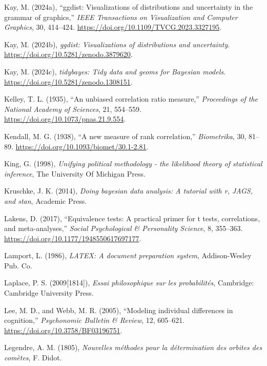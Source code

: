 \documentclass[
  10pt,
  a4paper,
  twoside]{article}
\newlength{\cslhangindent}
\newenvironment{CSLReferences}[2] %
 {\begin{list}{}{%
  \setlength{\itemindent}{0pt}
  \setlength{\leftmargin}{0pt}
  \setlength{\parsep}{0pt}
  \ifodd #1
   \setlength{\leftmargin}{\cslhangindent}
   \setlength{\itemindent}{-1\cslhangindent}
  \fi
  \setlength{\itemsep}{#2\baselineskip}}}
 {\end{list}}
\begin{document}
\begin{CSLReferences}{1}{0}
Kay, M. (2024a), {``{ggdist}: Visualizations of distributions and uncertainty in the grammar of graphics,''} \emph{IEEE Transactions on Visualization and Computer Graphics}, 30, 414--424. \url{https://doi.org/10.1109/TVCG.2023.3327195}.

Kay, M. (2024b), \emph{{ggdist}: Visualizations of distributions and uncertainty}. \url{https://doi.org/10.5281/zenodo.3879620}.

Kay, M. (2024c), \emph{{tidybayes}: Tidy data and geoms for {Bayesian} models}. \url{https://doi.org/10.5281/zenodo.1308151}.

Kelley, T. L. (1935), {``An unbiased correlation ratio measure,''} \emph{Proceedings of the National Academy of Sciences}, 21, 554--559. \url{https://doi.org/10.1073/pnas.21.9.554}.

Kendall, M. G. (1938), {``A new measure of rank correlation,''} \emph{Biometrika}, 30, 81--89. \url{https://doi.org/10.1093/biomet/30.1-2.81}.

King, G. (1998), \emph{Unifying political methodology - the likelihood theory of statistical inference}, The University Of Michigan Press.

Kruschke, J. K. (2014), \emph{Doing bayesian data analysis: A tutorial with r, JAGS, and stan}, Academic Press.

Lakens, D. (2017), {``Equivalence tests: A practical primer for t tests, correlations, and meta-analyses,''} \emph{Social Psychological \& Personality Science}, 8, 355--363. \url{https://doi.org/10.1177/1948550617697177}.

Lamport, L. (1986), \emph{LATEX: A document preparation system}, Addison-Wesley Pub. Co.

Laplace, P. S. (2009{[}1814{]}), \emph{Essai philosophique sur les probabilités}, Cambridge: Cambridge University Press.

Lee, M. D., and Webb, M. R. (2005), {``Modeling individual differences in cognition,''} \emph{Psychonomic Bulletin \& Review}, 12, 605--621. \url{https://doi.org/10.3758/BF03196751}.

Legendre, A. M. (1805), \emph{Nouvelles méthodes pour la détermination des orbites des comètes}, F. Didot.


\end{CSLReferences}
\end{document}
